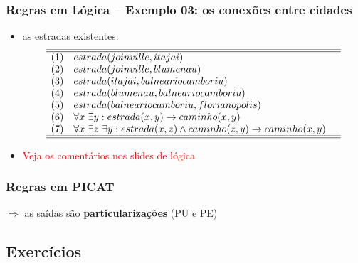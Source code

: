 \documentclass[10pt]{beamer}
\begin{document}
\begin{frame}
    \frametitle{Regras  em Lógica -- Exemplo 03: os conexões entre cidades}
   
   \begin{itemize}
    \item as estradas existentes:
  $$\begin{array}{lll} \hline\hline
	(1) & estrada(joinville, itajai) & \\
	(2) & estrada(joinville, blumenau) & \\
	(3) & estrada(itajai, balneariocamboriu) & \\
	(4) & estrada(blumenau, balneariocamboriu) & \\
	(5) & estrada(balneariocamboriu, florianopolis) & \\
	(6) & \forall x ~\exists y: estrada(x, y) \rightarrow caminho(x, y) & \\
	(7) & \forall x ~\exists z ~\exists y: estrada(x, z) \wedge caminho(z, y) \rightarrow caminho  (x,y) &\\
	\hline\hline
	\end{array}$$	

    \item \textcolor{red}{Veja os comentários nos slides de lógica}
    \end{itemize}
\end{frame}



\begin{frame}[allowframebreaks=0.9]
 \frametitle{Regras em PICAT}


  $\Rightarrow $ as saídas são \textbf{particularizações} (PU e PE)
 
\end{frame}


\subsection{Exercícios}
\end{document}
